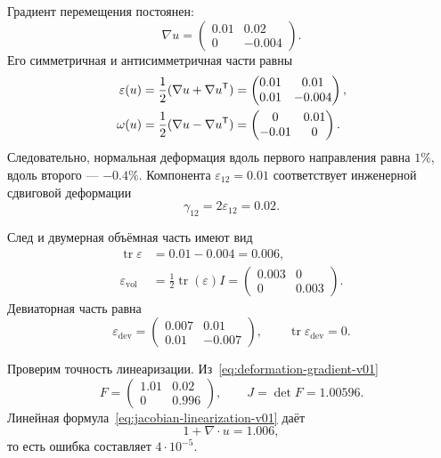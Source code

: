 Градиент перемещения постоянен:
\begin{equation}
\label{eq:worked-gradient-v01}
\nabla u
=
\begin{pmatrix}
0.01 & 0.02\\
0 & -0.004
\end{pmatrix}.
\end{equation}
Его симметричная и антисимметричная части равны
\begin{align}
\varepsilon(u)
&=
\frac12(\nabla u+\nabla u^{\mathsf{T}})
=
\begin{pmatrix}
0.01 & 0.01\\
0.01 & -0.004
\end{pmatrix},
\label{eq:worked-small-strain-v01}\\
\omega(u)
&=
\frac12(\nabla u-\nabla u^{\mathsf{T}})
=
\begin{pmatrix}
0 & 0.01\\
-0.01 & 0
\end{pmatrix}.
\label{eq:worked-rotation-v01}
\end{align}
Следовательно, нормальная деформация вдоль первого направления равна $1\%$, вдоль второго --- $-0.4\%$. Компонента $\varepsilon_{12}=0.01$ соответствует инженерной сдвиговой деформации
\[
\gamma_{12}=2\varepsilon_{12}=0.02.
\]

След и двумерная объёмная часть имеют вид
\begin{align}
\operatorname{tr}\varepsilon
&=0.01-0.004=0.006,\label{eq:worked-trace-v01}\\
\varepsilon_{\mathrm{vol}}
&=
\frac12\operatorname{tr}(\varepsilon)I
=
\begin{pmatrix}
0.003&0\\
0&0.003
\end{pmatrix}.
\label{eq:worked-volumetric-v01}
\end{align}
Девиаторная часть равна
\begin{equation}
\label{eq:worked-deviatoric-v01}
\varepsilon_{\mathrm{dev}}
=
\begin{pmatrix}
0.007&0.01\\
0.01&-0.007
\end{pmatrix},
\qquad
\operatorname{tr}\varepsilon_{\mathrm{dev}}=0.
\end{equation}

Проверим точность линеаризации. Из~\eqref{eq:deformation-gradient-v01}
\[
F
=
\begin{pmatrix}
1.01&0.02\\
0&0.996
\end{pmatrix},
\qquad
J=\det F=1.00596.
\]
Линейная формула~\eqref{eq:jacobian-linearization-v01} даёт
\[
1+\nabla\cdot u=1.006,
\]
то есть ошибка составляет $4\cdot10^{-5}$.

